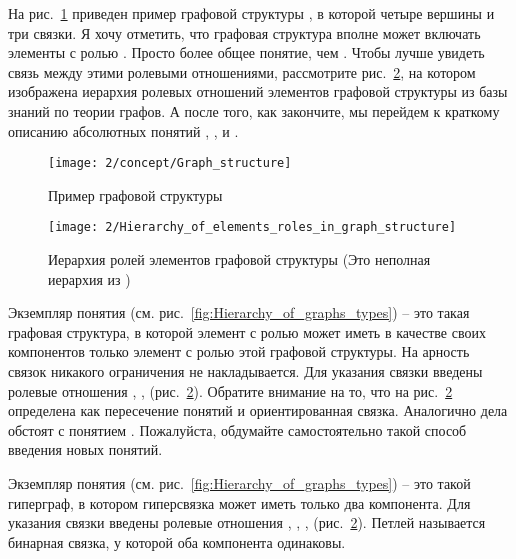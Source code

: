 На рис.~\ref{fig:Graph_structure_example} приведен пример графовой
структуры , в которой четыре вершины и три связки. Я хочу
отметить, что графовая структура вполне может включать элементы с
ролью . Просто  более общее понятие, чем
. Чтобы лучше увидеть связь между этими ролевыми
отношениями, рассмотрите
рис.~\ref{fig:Hierarchy_of_elements_roles_in_graph_structure}, на
котором изображена иерархия ролевых отношений элементов графовой
структуры из базы знаний по теории графов. А после того, как
закончите, мы перейдем к краткому описанию абсолютных понятий
, ,  и .

\begin{figure}[h!]
  \centering
  \texttt{[image: 2/concept/Graph\_structure]}
  \caption{Пример графовой структуры }
  \label{fig:Graph_structure_example}
\end{figure}
 
\begin{figure}[h!]
  \centering
  \texttt{[image: 2/Hierarchy\_of\_elements\_roles\_in\_graph\_structure]}
  \caption{Иерархия ролей элементов графовой структуры (Это неполная
    иерархия из \ostisgtlink)}
  \label{fig:Hierarchy_of_elements_roles_in_graph_structure}
\end{figure}

Экземпляр понятия 
(см. рис.~\ref{fig:Hierarchy_of_graphs_types}) – это такая графовая
структура, в которой элемент с ролью  может иметь в
качестве своих компонентов только элемент с ролью  этой
графовой структуры.  На арность связок никакого ограничения не
накладывается. Для указания связки введены ролевые отношения
, , 
(рис.~\ref{fig:Hierarchy_of_elements_roles_in_graph_structure}). Обратите
внимание на то, что на
рис.~\ref{fig:Hierarchy_of_elements_roles_in_graph_structure}
 определена как пересечение понятий 
и {ориентированная связка}. Аналогично дела обстоят с понятием
. Пожалуйста, обдумайте самостоятельно такой способ
введения новых понятий.

Экземпляр понятия 
(см. рис.~\ref{fig:Hierarchy_of_graphs_types}) – это такой гиперграф,
в котором гиперсвязка может иметь только два компонента.  Для указания
связки введены ролевые отношения , ,
, 
(рис.~\ref{fig:Hierarchy_of_elements_roles_in_graph_structure}). Петлей
называется бинарная связка, у которой оба компонента одинаковы.

